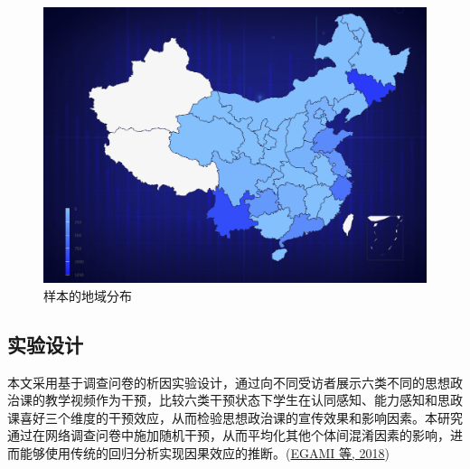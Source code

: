 \documentclass[
  12pt,
]{ctexart}
\begin{document}
\begin{figure}[h]

{\centering \includegraphics[width=0.9\linewidth]{../figures/figure2} 

}

\caption{样本的地域分布}\label{fig:unnamed-chunk-2}
\end{figure}

\hypertarget{ux5b9eux9a8cux8bbeux8ba1}{%
\subsection{实验设计}\label{ux5b9eux9a8cux8bbeux8ba1}}

本文采用基于调查问卷的析因实验设计，通过向不同受访者展示六类不同的思想政治课的教学视频作为干预，比较六类干预状态下学生在认同感知、能力感知和思政课喜好三个维度的干预效应，从而检验思想政治课的宣传效果和影响因素。本研究通过在网络调查问卷中施加随机干预，从而平均化其他个体间混淆因素的影响，进而能够使用传统的回归分析实现因果效应的推断。(\protect\hyperlink{ref-EgamiImai2018}{EGAMI 等, 2018})
\end{document}
